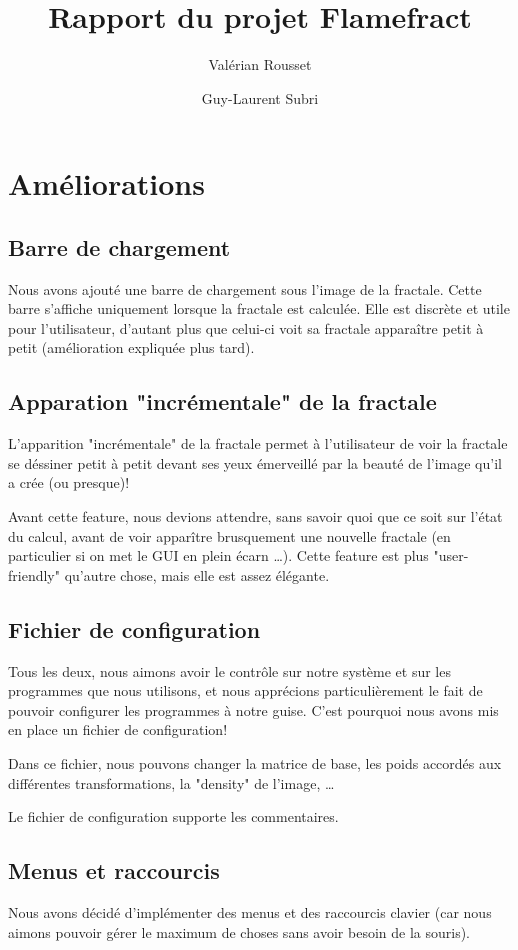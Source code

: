 \documentclass[a4paper]{article}
\author{Valérian Rousset \and Guy-Laurent Subri}
\title{Rapport du projet Flamefract}
\begin{document}
\maketitle

\section*{Améliorations}

\subsection*{Barre de chargement}
Nous avons ajouté une barre de chargement sous l'image de la fractale. Cette barre s'affiche uniquement lorsque la fractale est calculée. Elle est discrète et utile pour l'utilisateur, d'autant plus que celui-ci voit sa fractale apparaître petit à petit (amélioration expliquée plus tard).

\subsection*{Apparation "incrémentale" de la fractale}
L'apparition "incrémentale" de la fractale permet à l'utilisateur de voir la fractale se déssiner petit à petit devant ses yeux émerveillé par la beauté de l'image qu'il a crée (ou presque)!

Avant cette feature, nous devions attendre, sans savoir quoi que ce soit sur l'état du calcul, avant de voir apparître brusquement une nouvelle fractale (en particulier si on met le GUI en plein écarn \ldots). Cette feature est plus "user-friendly" qu'autre chose, mais elle est assez élégante.

\subsection*{Fichier de configuration}
Tous les deux, nous aimons avoir le contrôle sur notre système et sur les programmes que nous utilisons, et nous apprécions particulièrement le fait de pouvoir configurer les programmes à notre guise. C'est pourquoi nous avons mis en place un fichier de configuration!

Dans ce fichier, nous pouvons changer la matrice de base, les poids accordés aux différentes transformations, la "density" de l'image, \ldots

Le fichier de configuration supporte les commentaires.

\subsection*{Menus et raccourcis}
Nous avons décidé d'implémenter des menus et des raccourcis clavier (car nous aimons pouvoir gérer le maximum de choses sans avoir besoin de la souris).
\end{document}
